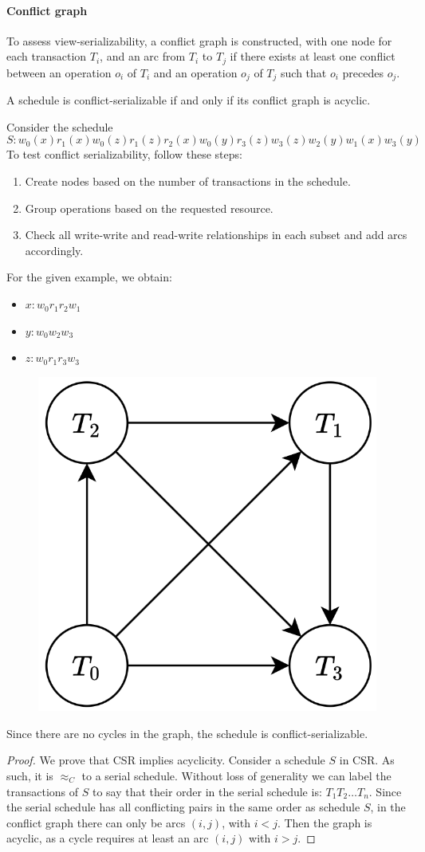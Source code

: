 \paragraph*{Conflict graph}
To assess view-serializability, a conflict graph is constructed, with one node for each transaction $T_i$, and an arc from $T_i$ to $T_j$ if there exists at least one conflict between an operation $o_i$ of $T_i$ and an operation $o_j$ of $T_j$ such that $o_i$ precedes $o_j$.
\begin{theorem}
    A schedule is conflict-serializable if and only if its conflict graph is acyclic.
\end{theorem}
\begin{example}
    Consider the schedule 
    \[S: w_0(x) r_1(x) w_0(z) r_1(z) r_2(x) w_0(y) r_3(z) w_3(z) w_2(y) w_1(x) w_3(y)\]
    To test conflict serializability, follow these steps:
    \begin{enumerate}
        \item Create nodes based on the number of transactions in the schedule.
        \item Group operations based on the requested resource.
        \item Check all write-write and read-write relationships in each subset and add arcs accordingly. 
    \end{enumerate}
    For the given example, we obtain:
    \begin{itemize}
        \item $x: w_0 r_1 r_2 w_1$
        \item $y: w_0 w_2 w_3$
        \item $z: w_0 r_1 r_3 w_3$
    \end{itemize}
    \begin{figure}[H]
        \centering
        \includegraphics[width=0.25\linewidth]{images/conflict.png}
    \end{figure}
    Since there are no cycles in the graph, the schedule is conflict-serializable.
\end{example}
\begin{proof}
    We prove that CSR implies acyclicity. 
    Consider a schedule $S$ in CSR. 
    As such, it is $\approx_C$ to a serial schedule. 
    Without loss of generality we can label the transactions of $S$ to say that their order in the serial schedule is: $T_1 T_2 \dots T_n$.
    Since the serial schedule has all conflicting pairs in the same order as schedule $S$, in the conflict graph there can only be arcs $(i,j)$, with $i<j$. 
    Then the graph is acyclic, as a cycle requires at least an arc $(i,j)$ with $i>j$.
\end{proof}

